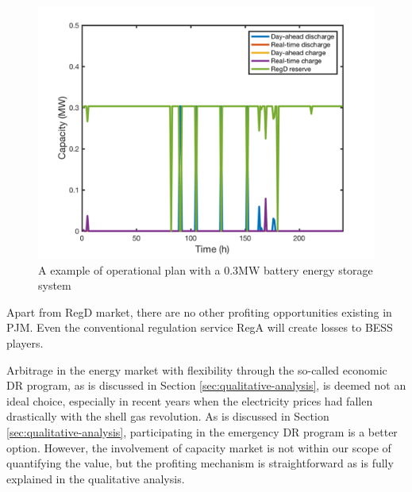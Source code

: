 \begin{figure}[h!]
	\centering
	\includegraphics[width=0.9\linewidth]{Figures/PJM_multitasking_example}
	\caption{A example of operational plan with a 0.3MW battery energy storage system}
	\label{fig:pjm-multitasking}
\end{figure}

Apart from RegD market, there are no other profiting opportunities existing in PJM. Even the conventional regulation service RegA will create losses to BESS players.

Arbitrage in the energy market with flexibility through the so-called economic DR program, as is discussed in Section \ref{sec:qualitative-analysis}, is deemed not an ideal choice, especially in recent years when the electricity prices had fallen drastically with the shell gas revolution. As is discussed in Section \ref{sec:qualitative-analysis}, participating in the emergency DR program is a better option. However, the involvement of capacity market is not within our scope of quantifying the value, but the profiting mechanism is straightforward as is fully explained in the qualitative analysis.

